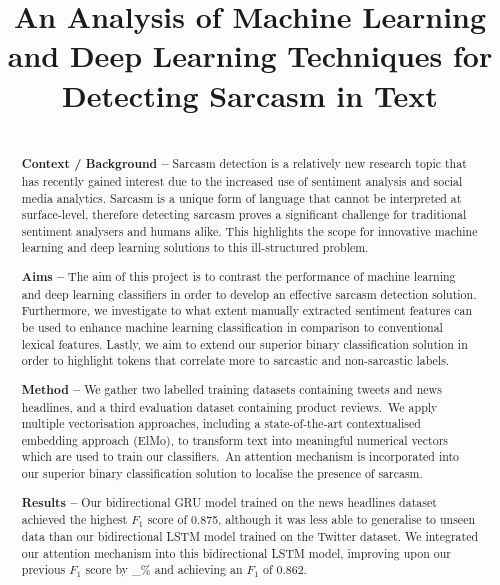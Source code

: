 \documentclass[12pt,a4paper]{article}
\title{An Analysis of Machine Learning and Deep Learning Techniques for Detecting Sarcasm in Text}
\author{} %
\date{}
\begin{document}
	
\maketitle

\begin{abstract}
\\ \noindent \textbf{Context / Background --} 
Sarcasm detection is a relatively new research topic that has recently gained interest due to the increased use of sentiment analysis and social media analytics. Sarcasm is a unique form of language that cannot be interpreted at surface-level, therefore detecting sarcasm proves a significant challenge for traditional sentiment analysers and humans alike. This highlights the scope for innovative machine learning and deep learning solutions to this ill-structured problem.\vspace{5pt}

\noindent \textbf{Aims --} The aim of this project is to contrast the performance of machine learning and deep learning classifiers in order to develop an effective sarcasm detection solution. Furthermore, we investigate to what extent manually extracted sentiment features can be used to enhance machine learning classification in comparison to conventional lexical features. Lastly, we aim to extend our superior binary classification solution in order to highlight tokens that correlate more to sarcastic and non-sarcastic labels.\vspace{5pt}

\noindent \textbf{Method --} We gather two labelled training datasets containing tweets and news headlines, and a third evaluation dataset containing product reviews.\ We apply multiple vectorisation approaches, including a state-of-the-art contextualised embedding approach (ElMo), to transform text into meaningful numerical vectors which are used to train our classifiers.\ An attention mechanism is incorporated into our superior binary classification solution to localise the presence of sarcasm.\vspace{5pt}

\noindent \textbf{Results --} Our bidirectional GRU model trained on the news headlines dataset achieved the highest $F_1$ score of 0.875, although it was less able to generalise to unseen data than our bidirectional LSTM model trained on the Twitter dataset. We integrated our attention mechanism into this bidirectional LSTM model, improving upon our previous $F_1$ score by \_\% and achieving an $F_1$ of 0.862.\vspace{5pt}


\end{abstract}
\end{document}
